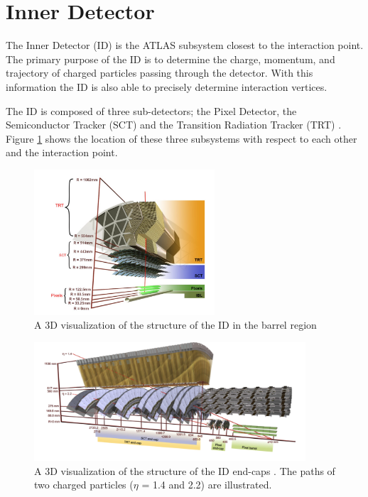 \section{Inner Detector}

\indent The Inner Detector (ID) is the ATLAS subsystem closest to the interaction point. The primary purpose of the ID is to determine the charge, momentum, and trajectory of charged particles passing through the detector. With this information the ID is also able to precisely determine interaction vertices. \par

\indent The ID is composed of three sub-detectors; the Pixel Detector, the Semiconductor Tracker (SCT) and the Transition Radiation Tracker (TRT) \cite{atlas_overview}. Figure \ref{fig:innerDetector} shows the location of these three subsystems with respect to each other and the interaction point. \par

\begin{figure}
        \centering
	\includegraphics[width=0.6\textwidth]{figures/ch4/innerDetector.png}
	\caption{A 3D visualization of the structure of the ID in the barrel region \cite{innerDet}}
	\label{fig:innerDetector}
\end{figure}

\begin{figure}
        \centering
	\includegraphics[width=0.9\textwidth]{figures/ch4/innerDetectorEC}
	\caption{A 3D visualization of the structure of the ID end-caps \cite{atlas_overview}. The paths of two charged particles ($\eta$ = 1.4 and 2.2) are illustrated.}
	\label{fig:innerDetectorEC}
\end{figure}

